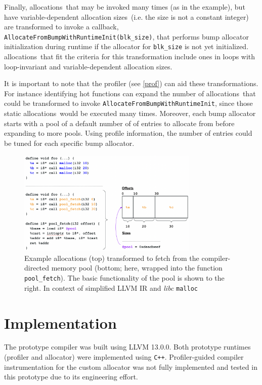 \documentclass{article}
\def\ALLS{allocations}
\def\SIZES{allocation sizes}
\begin{document}
Finally, \ALLS\ that may be invoked many times (as in the example), but have 
variable-dependent \SIZES\ (i.e. the size is not a constant integer) are transformed to 
invoke a callback, \texttt{AllocateFromBumpWithRuntimeInit(blk\_size)}, that performs 
bump allocator initialization during runtime if the allocator for \texttt{blk\_size} is not
yet initialized. \ALLS\ that fit the criteria for this transformation include ones
in loops with loop-invariant and variable-dependent \SIZES .

It is important to note that the profiler (see \ref{prof}) can aid these transformations.
For instance identifying hot functions can expand the number of \ALLS\ that could
be transformed to invoke \texttt{AllocateFromBumpWithRuntimeInit}, since those static
\ALLS\ would be executed many times. Moreover, each bump allocator starts with a pool of 
a default number of of entries to allocate from before expanding to more pools. Using
profile information, the number of entries could be tuned for each specific bump allocator.

\begin{figure} [htp]
        \centering
        \includegraphics[width=0.77\textwidth]{figs/pool.png} 
        \caption{Example allocations (top) transformed to fetch from the compiler-directed
        memory pool (bottom; here, wrapped into the function \texttt{pool\_fetch}). The 
        basic functionality of the pool is shown to the right. In context of simplified LLVM 
        IR and \textit{libc} \texttt{malloc}}  
	    \label{fig:pool}
\end{figure}

\section{Implementation}
The prototype compiler was built using LLVM 13.0.0. Both prototype runtimes (profiler and allocator) 
were implemented using \texttt{C++}. Profiler-guided compiler instrumentation for the custom 
allocator was not fully implemented and tested in this prototype due to its engineering effort.
\end{document}
